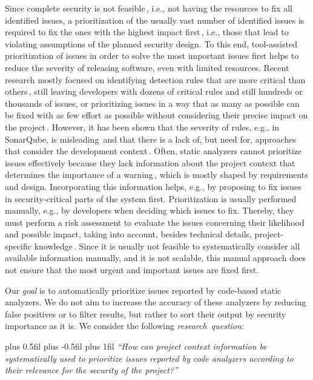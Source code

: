 Since complete security is not feasible\,\cite{Mazurek2022}, i.e., not having the resources to fix all identified issues, a prioritization of the usually vast number of identified issues is required to fix the ones with the highest impact first\,\cite{Walden2014}, i.e., those that lead to violating assumptions of the planned security design. To this end, tool-assisted prioritization of issues in order to solve the most important issues first helps to reduce the severity of releasing software, even with limited resources.
Recent research mostly focused on identifying detection rules that are more critical than others\,\cite{FV15}, still leaving developers with dozens of critical rules and still hundreds or thousands of issues, or prioritizing issues in a way that as many as possible can be fixed with as few effort as possible without considering their precise impact on the project\,\cite{AB19}.
However, it has been shown that the severity of rules, e.g., in SonarQube, is misleading\,\cite{Katin2022} and that there is a lack of, but need for, approaches that consider the development context\,\cite{Pina21}.
Often, static analyzers cannot prioritize issues effectively because they lack information about the project context that determines the importance of a warning\,\cite{Walden2014}, which is mostly %
shaped
by requirements and design.
Incorporating this information helps, %
e.g.,
by proposing to fix issues in security-critical parts of the system first.
Prioritization is usually performed manually, e.g., by developers when deciding which issues to fix.
Thereby, they must perform a risk assessment to evaluate the issues concerning their likelihood and possible impact, taking into account, besides technical details, project-specific knowledge\,\cite{shedden2011incorporating}.
Since it is usually not feasible to systematically consider all available information manually, and it is not scalable, this manual approach does not ensure that the most urgent and important issues are fixed first.

\begin{samepage}
Our \emph{goal} is to automatically prioritize issues reported by code-based static analyzers.
We do not aim to increase the accuracy of these analyzers by reducing false positives
or to filter results, but rather to sort their output by security importance as it is.
We consider the following \emph{research~question}:

\begingroup
\leftskip=0cm plus 0.5fil \rightskip=0cm plus -0.5fil
\parfillskip=0cm plus 1fil
\noindent
\emph{\enquote{How can project context information be systematically used to prioritize %
issues reported by code analyzers according to
their relevance for the security of the project?}}%
\par
\endgroup
\end{samepage}

